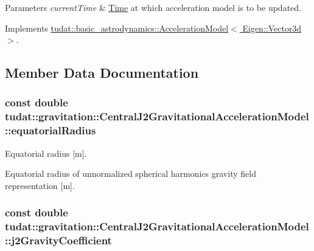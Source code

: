 \begin{DoxyParams}{Parameters}
{\em current\+Time} & \hyperlink{classtudat_1_1Time}{Time} at which acceleration model is to be updated. \\
\hline
\end{DoxyParams}


Implements \hyperlink{classtudat_1_1basic__astrodynamics_1_1AccelerationModel_a966e85b72300b8cbc99ba60e40108d71}{tudat\+::basic\+\_\+astrodynamics\+::\+Acceleration\+Model$<$ Eigen\+::\+Vector3d $>$}.



\subsection{Member Data Documentation}
\subsubsection[{\texorpdfstring{equatorial\+Radius}{equatorialRadius}}]{\setlength{\rightskip}{0pt plus 5cm}const double tudat\+::gravitation\+::\+Central\+J2\+Gravitational\+Acceleration\+Model\+::equatorial\+Radius\hspace{0.3cm}{\ttfamily [protected]}}\hypertarget{classtudat_1_1gravitation_1_1CentralJ2GravitationalAccelerationModel_a6d026fff91793df3c8160e9f3fc07c1e}{}\label{classtudat_1_1gravitation_1_1CentralJ2GravitationalAccelerationModel_a6d026fff91793df3c8160e9f3fc07c1e}


Equatorial radius \mbox{[}m\mbox{]}. 

Equatorial radius of unnormalized spherical harmonics gravity field representation \mbox{[}m\mbox{]}. 
\subsubsection[{\texorpdfstring{j2\+Gravity\+Coefficient}{j2GravityCoefficient}}]{\setlength{\rightskip}{0pt plus 5cm}const double tudat\+::gravitation\+::\+Central\+J2\+Gravitational\+Acceleration\+Model\+::j2\+Gravity\+Coefficient\hspace{0.3cm}{\ttfamily [protected]}}\hypertarget{classtudat_1_1gravitation_1_1CentralJ2GravitationalAccelerationModel_a7197466bf1fd2bb185ebfef5660b1d57}{}\label{classtudat_1_1gravitation_1_1CentralJ2GravitationalAccelerationModel_a7197466bf1fd2bb185ebfef5660b1d57}


